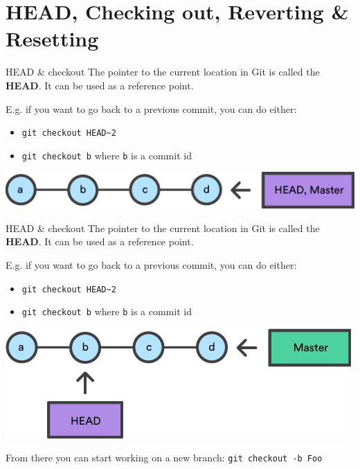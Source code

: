 \documentclass[usenames,dvipsnames,9pt]{beamer}
\begin{document}
\section{HEAD, Checking out, Reverting \& Resetting}

%
\begin{frame}[t]{HEAD \& checkout}
  \vspace{0.5cm}
  The pointer to the current location in Git is called the \textbf{HEAD}.
  It can be used as a reference point.

  E.g. if you want to go back to a previous commit, you can do either:
  \begin{itemize}
    \item \lstinline|git checkout HEAD~2|
    \item \lstinline|git checkout b| where \lstinline|b| is a commit id
  \end{itemize}

  \vspace{0.53cm}
  \includegraphics[scale=1.5]{img/undoing/git-sequence-transparent.png}
\end{frame}

%
\begin{frame}[t]{HEAD \& checkout}
  \vspace{0.5cm}
  The pointer to the current location in Git is called the \textbf{HEAD}.
  It can be used as a reference point.

  E.g. if you want to go back to a previous commit, you can do either:
  \begin{itemize}
    \item \lstinline|git checkout HEAD~2|
    \item \lstinline|git checkout b| where \lstinline|b| is a commit id
  \end{itemize}

  \vspace{0.5cm}
  \includegraphics[scale=1.5]{img/undoing/2497537634-git-checkout-transparent.png}

  From there you can start working on a new branch: \lstinline|git checkout -b Foo|
\end{frame}
\end{document}
